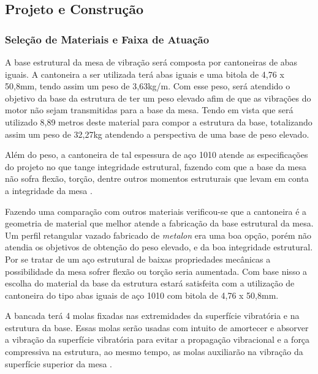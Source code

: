 

\subsection{Projeto e Construção}


\subsubsection*{\textbf{Seleção de Materiais e Faixa de Atuação}}


A base estrutural da mesa de vibração será composta por cantoneiras de abas iguais. A cantoneira a ser utilizada terá abas iguais e uma bitola de 4,76 x 50,8mm, tendo assim um peso de 3,63kg/m. Com esse peso, será atendido o objetivo da base da estrutura de ter um peso elevado afim de que as vibrações do motor não sejam transmitidas para a base da mesa. Tendo em vista que será utilizado 8,89 metros deste material para compor a estrutura da base, totalizando assim um peso de 32,27kg atendendo a perspectiva de uma base de peso elevado.

Além do peso, a cantoneira de tal espessura de aço 1010 atende as especificações do projeto no que tange integridade estrutural, fazendo com que a base da mesa não sofra flexão, torção, dentre outros momentos estruturais que levam em conta a integridade da mesa \cite{acos_continente}.

Fazendo uma comparação com outros materiais verificou-se que a cantoneira é a geometria de material que melhor atende a fabricação da base estrutural da mesa. Um perfil retangular vazado fabricado de \textit{metalon} era uma boa opção, porém não atendia os objetivos de obtenção do peso elevado, e da boa integridade estrutural. Por se tratar de um aço estrutural de baixas propriedades mecânicas a possibilidade da mesa sofrer flexão ou torção seria aumentada. Com base nisso a escolha do material da base da estrutura estará satisfeita com a utilização de cantoneira do tipo abas iguais de aço 1010 com bitola de 4,76 x 50,8mm.

    A bancada terá 4 molas fixadas nas extremidades da superfície vibratória e na estrutura da base. Essas molas serão usadas com intuito de amortecer e absorver a vibração da superfície vibratória para evitar a propagação vibracional e a força compressiva na estrutura, ao mesmo tempo, as molas auxiliarão na vibração da superfície superior da mesa \cite{mola_santos}.


